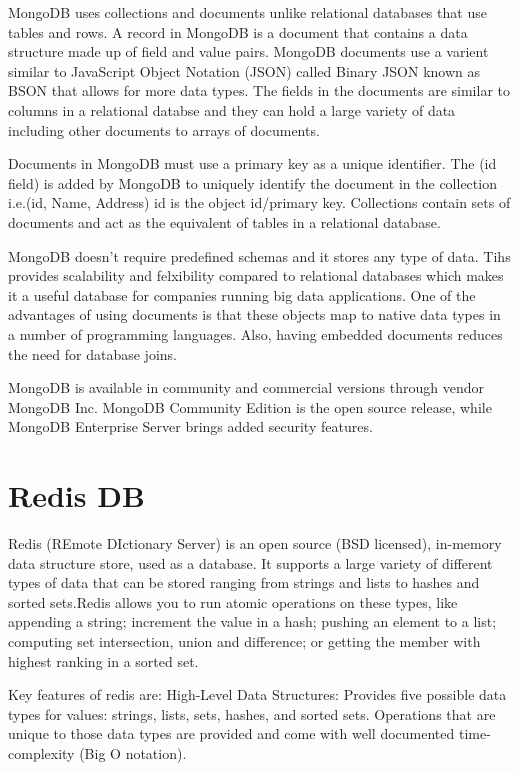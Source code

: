 MongoDB uses collections and documents unlike relational databases that use tables and rows. A record in MongoDB is a document that contains a data structure made up of field and value pairs. MongoDB documents use a varient similar to JavaScript Object Notation (JSON) called Binary JSON known as BSON that allows for more data types. The fields in the documents are similar to columns in a relational databse and they can hold a large variety of data including other documents to arrays of documents.\newline

Documents in MongoDB must use a primary key as a unique identifier.
The (id field) is added by MongoDB to uniquely identify the document in the collection i.e.(id, Name, Address) id is the object id/primary key. Collections contain sets of documents and act as the equivalent of tables in a relational database.\newline

MongoDB doesn't require predefined schemas and it stores any type of data. Tihs provides scalability and felxibility compared to relational databases which makes it a useful database for companies running big data applications. One of the advantages of using documents is that these objects map to native data types in a number of programming languages. Also, having embedded documents reduces the need for database joins.\newline

MongoDB is available in community and commercial versions through vendor MongoDB Inc. MongoDB Community Edition is the open source release, while MongoDB Enterprise Server brings added security features.\newline

\section {Redis DB}
Redis (REmote DIctionary Server) is an open source (BSD licensed), in-memory data structure store, used as a database. It supports a large variety of different types of data that can be stored ranging from strings and lists to hashes and sorted sets.Redis allows you to run atomic operations on these types, like appending a string; increment the value in a hash; pushing an element to a list; computing set intersection, union and difference; or getting the member with highest ranking in a sorted set.
\newline

Key features of redis are:\newline
High-Level Data Structures:  Provides five possible data types for values: strings, lists, sets, hashes, and sorted sets. Operations that are unique to those data types are provided and come with well documented time-complexity (Big O notation).\newline

